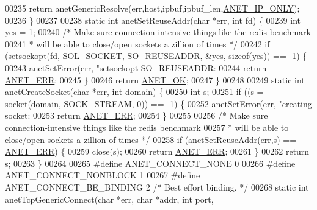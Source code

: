 \begin{DoxyCode}
{{{{{{{{{{{00235     \textcolor{keywordflow}{return} anetGenericResolve(err,host,ipbuf,ipbuf\_len,\hyperlink{anet_8h_a705c91a7b61459ba004364262845c5f4}{ANET\_IP\_ONLY});
00236 \}
00237 
00238 \textcolor{keyword}{static} \textcolor{keywordtype}{int} anetSetReuseAddr(\textcolor{keywordtype}{char} *err, \textcolor{keywordtype}{int} fd) \{
00239     \textcolor{keywordtype}{int} yes = 1;
00240     \textcolor{comment}{/* Make sure connection-intensive things like the redis benchmark}
00241 \textcolor{comment}{     * will be able to close/open sockets a zillion of times */}
00242     \textcolor{keywordflow}{if} (setsockopt(fd, SOL\_SOCKET, SO\_REUSEADDR, &yes, \textcolor{keyword}{sizeof}(yes)) == -1) \{
00243         anetSetError(err, \textcolor{stringliteral}{"setsockopt SO\_REUSEADDR: %
00244         \textcolor{keywordflow}{return} \hyperlink{anet_8h_a0697b7774a7e0f4ef141839fe93536fe}{ANET\_ERR};
00245     \}
00246     \textcolor{keywordflow}{return} \hyperlink{anet_8h_a25fb91ccc6457153f6d2e21380d4c6cf}{ANET\_OK};
00247 \}
00248 
00249 \textcolor{keyword}{static} \textcolor{keywordtype}{int} anetCreateSocket(\textcolor{keywordtype}{char} *err, \textcolor{keywordtype}{int} domain) \{
00250     \textcolor{keywordtype}{int} s;
00251     \textcolor{keywordflow}{if} ((s = socket(domain, SOCK\_STREAM, 0)) == -1) \{
00252         anetSetError(err, \textcolor{stringliteral}{"creating socket: %
00253         \textcolor{keywordflow}{return} \hyperlink{anet_8h_a0697b7774a7e0f4ef141839fe93536fe}{ANET\_ERR};
00254     \}
00255 
00256     \textcolor{comment}{/* Make sure connection-intensive things like the redis benchmark}
00257 \textcolor{comment}{     * will be able to close/open sockets a zillion of times */}
00258     \textcolor{keywordflow}{if} (anetSetReuseAddr(err,s) == \hyperlink{anet_8h_a0697b7774a7e0f4ef141839fe93536fe}{ANET\_ERR}) \{
00259         close(s);
00260         \textcolor{keywordflow}{return} \hyperlink{anet_8h_a0697b7774a7e0f4ef141839fe93536fe}{ANET\_ERR};
00261     \}
00262     \textcolor{keywordflow}{return} s;
00263 \}
00264 
00265 \textcolor{preprocessor}{#}\textcolor{preprocessor}{define} \textcolor{preprocessor}{ANET\_CONNECT\_NONE} 0
00266 \textcolor{preprocessor}{#}\textcolor{preprocessor}{define} \textcolor{preprocessor}{ANET\_CONNECT\_NONBLOCK} 1
00267 \textcolor{preprocessor}{#}\textcolor{preprocessor}{define} \textcolor{preprocessor}{ANET\_CONNECT\_BE\_BINDING} 2 \textcolor{comment}{/* Best effort binding. */}
00268 \textcolor{keyword}{static} \textcolor{keywordtype}{int} anetTcpGenericConnect(\textcolor{keywordtype}{char} *err, \textcolor{keywordtype}{char} *addr, \textcolor{keywordtype}{int} port,
}}}}}}}}}}}}}
\end{DoxyCode}
